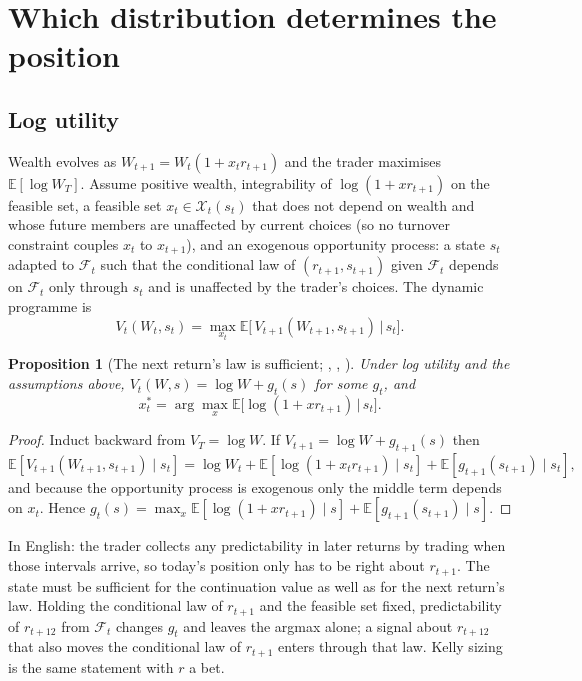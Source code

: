 \documentclass[11pt]{article}
\newtheorem{proposition}{Proposition}
\newcommand{\E}{\mathbb{E}}
\newcommand{\F}{\mathcal{F}}
\begin{document}
\section{Which distribution determines the position}

\subsection{Log utility}

Wealth evolves as $W_{t+1} = W_t(1 + x_t r_{t+1})$ and the trader maximises $\E[\log W_T]$. Assume positive wealth, integrability of $\log(1 + x r_{t+1})$ on the feasible set, a feasible set $x_t \in \mathcal{X}_t(s_t)$ that does not depend on wealth and whose future members are unaffected by current choices (so no turnover constraint couples $x_t$ to $x_{t+1}$), and an exogenous opportunity process: a state $s_t$ adapted to $\F_t$ such that the conditional law of $(r_{t+1}, s_{t+1})$ given $\F_t$ depends on $\F_t$ only through $s_t$ and is unaffected by the trader's choices. The dynamic programme is
\begin{equation}
V_t(W_t, s_t) = \max_{x_t} \E\big[\,V_{t+1}(W_{t+1}, s_{t+1}) \,\big|\, s_t\big].
\label{eq:dp}
\end{equation}

\begin{proposition}[The next return's law is sufficient; \citealt{mossin1968}, \citealt{samuelson1969}, \citealt{merton1969}]
Under log utility and the assumptions above, $V_t(W, s) = \log W + g_t(s)$ for some $g_t$, and
\[
x_t^\ast = \arg\max_x \E\big[\log(1 + x r_{t+1}) \,\big|\, s_t\big].
\]
\end{proposition}
\begin{proof}
Induct backward from $V_T = \log W$. If $V_{t+1} = \log W + g_{t+1}(s)$ then
\[
\E[V_{t+1}(W_{t+1}, s_{t+1}) \mid s_t] = \log W_t + \E[\log(1 + x_t r_{t+1}) \mid s_t] + \E[g_{t+1}(s_{t+1}) \mid s_t],
\]
and because the opportunity process is exogenous only the middle term depends on $x_t$. Hence $g_t(s) = \max_x \E[\log(1 + x r_{t+1}) \mid s] + \E[g_{t+1}(s_{t+1}) \mid s]$.
\end{proof}

In English: the trader collects any predictability in later returns by trading when those intervals arrive, so today's position only has to be right about $r_{t+1}$. The state must be sufficient for the continuation value as well as for the next return's law. Holding the conditional law of $r_{t+1}$ and the feasible set fixed, predictability of $r_{t+12}$ from $\F_t$ changes $g_t$ and leaves the argmax alone; a signal about $r_{t+12}$ that also moves the conditional law of $r_{t+1}$ enters through that law. Kelly sizing \citep{kelly1956} is the same statement with $r$ a bet.
\end{document}
